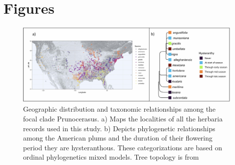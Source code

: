 \documentclass{article}[11pt]
\begin{document}
{%





 

\newpage
\section*{Figures}


\begin{figure}[h!]
  \centering
 \includegraphics[width=\textwidth]{..//..//Plots/fig1_new.jpg}
    \caption{Geographic distribution and taxonomic relationships among the focal clade Prunocerasus. a) Maps the localities of all the herbaria records used in this study. b) Depicts phylogenetic relationships among the American plums and the duration of their flowering period they are hysteranthous. These categorizations are based on ordinal phylogenetics mixed models. Tree topology is from \citet{Shaw:2004aa}}
    \label{fig:phylo2}
\end{figure}


}
\end{document}
